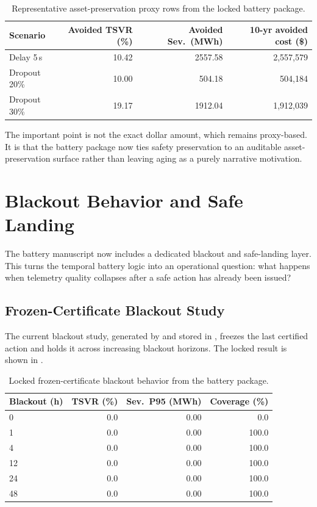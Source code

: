 \begin{table}[htbp]
\centering\small
\caption{Representative asset-preservation proxy rows from the locked battery package.}
\label{tab:aging_proxy}
\begin{tabular}{lrrr}
\toprule
Scenario & Avoided TSVR (\%) & Avoided Sev.\ (MWh) & 10-yr avoided cost (\$) \\
\midrule
Delay 5\,s & 10.42 & 2557.58 & 2{,}557{,}579 \\
Dropout 20\% & 10.00 & 504.18 & 504{,}184 \\
Dropout 30\% & 19.17 & 1912.04 & 1{,}912{,}039 \\
\bottomrule
\end{tabular}
\end{table}

The important point is not the exact dollar amount, which remains proxy-based.
It is that the battery package now ties safety preservation to an auditable
asset-preservation surface rather than leaving aging as a purely narrative
motivation.

\section{Blackout Behavior and Safe Landing}\label{sec:blackout_safe_landing}

The battery manuscript now includes a dedicated blackout and safe-landing
layer.  This turns the temporal battery logic into an operational question:
what happens when telemetry quality collapses after a safe action has already
been issued?

\subsection{Frozen-Certificate Blackout Study}

The current blackout study, generated by
 and stored in
, freezes the last certified action
and holds it across increasing blackout horizons.  The locked result is shown
in .

\begin{table}[htbp]
\centering\small
\caption{Locked frozen-certificate blackout behavior from the battery package.}
\label{tab:blackout_hold}
\begin{tabular}{lrrr}
\toprule
Blackout (h) & TSVR (\%) & Sev.\ P95 (MWh) & Coverage (\%) \\
\midrule
0 & 0.0 & 0.00 & 0.0 \\
1 & 0.0 & 0.00 & 100.0 \\
4 & 0.0 & 0.00 & 100.0 \\
12 & 0.0 & 0.00 & 100.0 \\
24 & 0.0 & 0.00 & 100.0 \\
48 & 0.0 & 0.00 & 100.0 \\
\bottomrule
\end{tabular}
\end{table}

